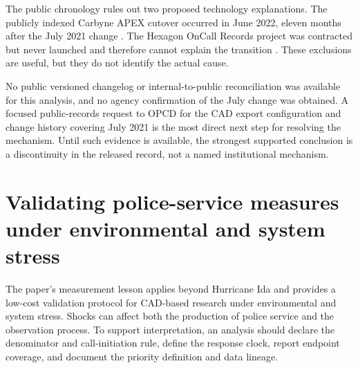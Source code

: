 \documentclass[11pt]{article}
\begin{document}
The public chronology rules out two proposed technology explanations. The publicly indexed Carbyne APEX cutover occurred in June 2022, eleven months after the July 2021 change \citep{OPCDCarbyne2022}. The Hexagon OnCall Records project was contracted but never launched and therefore cannot explain the transition \citep{NOLAOIGHexagon2024}. These exclusions are useful, but they do not identify the actual cause.

No public versioned changelog or internal-to-public reconciliation was available for this analysis, and no agency confirmation of the July change was obtained. A focused public-records request to OPCD for the CAD export configuration and change history covering July 2021 is the most direct next step for resolving the mechanism. Until such evidence is available, the strongest supported conclusion is a discontinuity in the released record, not a named institutional mechanism.

\section{Validating police-service measures under environmental and system stress}

The paper's measurement lesson applies beyond Hurricane Ida and provides a low-cost validation protocol for CAD-based research under environmental and system stress. Shocks can affect both the production of police service and the observation process. To support interpretation, an analysis should declare the denominator and call-initiation rule, define the response clock, report endpoint coverage, and document the priority definition and data lineage.
\end{document}
